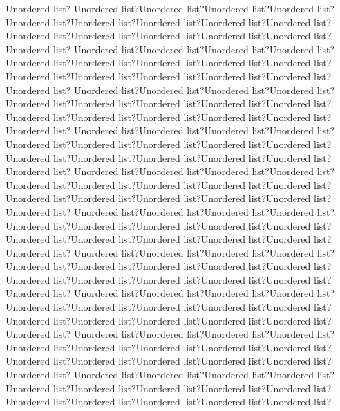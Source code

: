 \documentclass{article}
\begin{document}
Unordered list? Unordered list?Unordered list?Unordered list?Unordered list?Unordered list?Unordered list?Unordered list?Unordered list?Unordered list?Unordered list?Unordered list?Unordered list?Unordered list?Unordered list?Unordered list? Unordered list?Unordered list?Unordered list?Unordered list?Unordered list?Unordered list?Unordered list?Unordered list?Unordered list?Unordered list?Unordered list?Unordered list?Unordered list?Unordered list?Unordered list? Unordered list?Unordered list?Unordered list?Unordered list?Unordered list?Unordered list?Unordered list?Unordered list?Unordered list?Unordered list?Unordered list?Unordered list?Unordered list?Unordered list?Unordered list? Unordered list?Unordered list?Unordered list?Unordered list?Unordered list?Unordered list?Unordered list?Unordered list?Unordered list?Unordered list?Unordered list?Unordered list?Unordered list?Unordered list?Unordered list? Unordered list?Unordered list?Unordered list?Unordered list?Unordered list?Unordered list?Unordered list?Unordered list?Unordered list?Unordered list?Unordered list?Unordered list?Unordered list?Unordered list?Unordered list? Unordered list?Unordered list?Unordered list?Unordered list?Unordered list?Unordered list?Unordered list?Unordered list?Unordered list?Unordered list?Unordered list?Unordered list?Unordered list?Unordered list? Unordered list? Unordered list?Unordered list?Unordered list?Unordered list?Unordered list?Unordered list?Unordered list?Unordered list?Unordered list?Unordered list?Unordered list?Unordered list?Unordered list?Unordered list?Unordered list? Unordered list?Unordered list?Unordered list?Unordered list?Unordered list?Unordered list?Unordered list?Unordered list?Unordered list?Unordered list?Unordered list?Unordered list?Unordered list?Unordered list?Unordered list? Unordered list?Unordered list?Unordered list?Unordered list?Unordered list?Unordered list?Unordered list?Unordered list?Unordered list?Unordered list?Unordered list?Unordered list?Unordered list?Unordered list?Unordered list? Unordered list?Unordered list?Unordered list?Unordered list?Unordered list?Unordered list?Unordered list?Unordered list?Unordered list?Unordered list?Unordered list?Unordered list?Unordered list?Unordered list?
\end{document}
